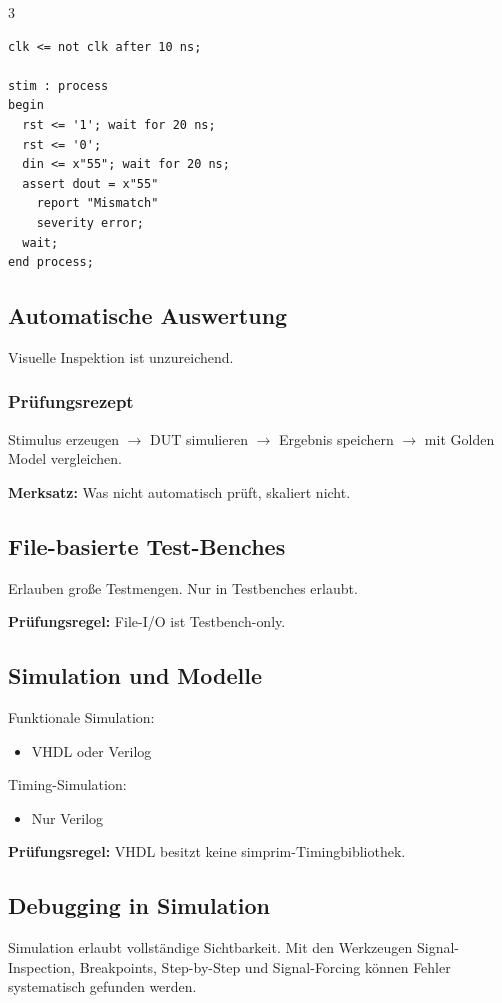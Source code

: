 \documentclass[10pt,a4paper]{article}
\newcommand{\hilite}[1]{\colorbox{yellow!25}{#1}}
\newcommand{\imp}[1]{\textbf{\textcolor{codeemph}{#1}}}
\begin{document}
\begin{multicols}{3}
\begin{lstlisting}
clk <= not clk after 10 ns;

stim : process
begin
  rst <= '1'; wait for 20 ns;
  rst <= '0';
  din <= x"55"; wait for 20 ns;
  assert dout = x"55"
    report "Mismatch"
    severity error;
  wait;
end process;
\end{lstlisting}

\subsection{Automatische Auswertung}
Visuelle Inspektion ist unzureichend.

\subsubsection*{\textcolor{codeemph}{Prüfungsrezept}}
Stimulus erzeugen $\rightarrow$ DUT simulieren $\rightarrow$ Ergebnis speichern $\rightarrow$ mit Golden Model vergleichen.


\textbf{Merksatz:}  
Was nicht \hilite{automatisch} \hilite{prüft}, \hilite{skaliert} nicht.

\subsection{File-basierte Test-Benches}
Erlauben große Testmengen.
Nur in Testbenches erlaubt.


\imp{Prüfungsregel:}  
\hilite{File-I}/O ist \hilite{Testbench}-\hilite{only}.

\subsection{Simulation und Modelle}
Funktionale Simulation:
\begin{itemize}
  \item VHDL oder Verilog
\end{itemize}

Timing-Simulation:
\begin{itemize}
  \item Nur Verilog
\end{itemize}

\imp{Prüfungsregel:}  
\hilite{VHDL} \hilite{besitzt} keine simprim-\hilite{Timing}bibliothek.

\subsection{Debugging in Simulation}
Simulation erlaubt vollständige Sichtbarkeit. Mit den Werkzeugen Signal-Inspection, Breakpoints, Step-by-Step und Signal-Forcing können Fehler systematisch gefunden werden.


\end{multicols}
\end{document}
